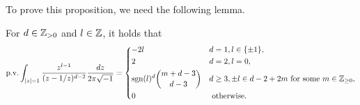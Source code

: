 \documentclass[11pt,a4paper,lualatex]{amsart}
\numberwithin{equation}{section} %
\begin{document}
To prove this proposition, we need the following lemma. 

\begin{lem} \label{lem:Cauchy_principal_value}
	For $ d \in \mathbb{Z}_{>0} $ and $ l \in \mathbb{Z} $, it holds that
	\[
	\mathrm{p.v.} \int_{\left\lvert z\right\rvert=1} \frac{z^{l-1}}{(z - 1/z)^{d - 2}} \frac{dz}{2\pi\sqrt{-1}}
	=
	\begin{dcases}
		-2l & d=1, l \in \{ \pm 1 \}, \\
		2 & d=2, l=0, \\
		\operatorname{sgn}(l)^d \binom{m+d-3}{d-3} & d \ge 3, \pm l \in d - 2 + 2m \text{ for some } m \in \mathbb{Z}_{\ge 0}, \\
		0 & \text{ otherwise.}
	\end{dcases}
	\]
\end{lem}
\end{document}

